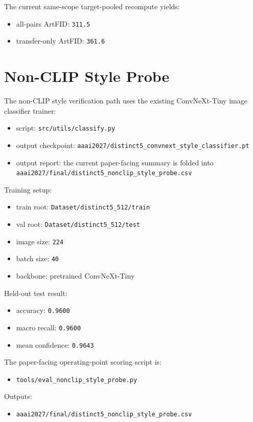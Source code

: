 \documentclass[letterpaper]{article}
\begin{document}
The current same-scope target-pooled recompute yields:
\begin{itemize}
\item all-pairs ArtFID: \texttt{311.5}
\item transfer-only ArtFID: \texttt{361.6}
\end{itemize}

\section{Non-CLIP Style Probe}
The non-CLIP style verification path uses the existing ConvNeXt-Tiny image classifier trainer:
\begin{itemize}
\item script: \texttt{src/utils/classify.py}
\item output checkpoint: \texttt{aaai2027/distinct5\_convnext\_style\_classifier.pt}
\item output report: the current paper-facing summary is folded into \texttt{aaai2027/final/distinct5\_nonclip\_style\_probe.csv}
\end{itemize}

Training setup:
\begin{itemize}
\item train root: \texttt{Dataset/distinct5\_512/train}
\item val root: \texttt{Dataset/distinct5\_512/test}
\item image size: \texttt{224}
\item batch size: \texttt{40}
\item backbone: pretrained ConvNeXt-Tiny
\end{itemize}

Held-out test result:
\begin{itemize}
\item accuracy: \texttt{0.9600}
\item macro recall: \texttt{0.9600}
\item mean confidence: \texttt{0.9643}
\end{itemize}

The paper-facing operating-point scoring script is:
\begin{itemize}
\item \texttt{tools/eval\_nonclip\_style\_probe.py}
\end{itemize}

Outputs:
\begin{itemize}
\item \texttt{aaai2027/final/distinct5\_nonclip\_style\_probe.csv}
\end{itemize}
\end{document}
